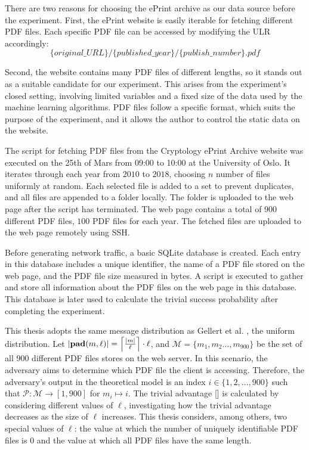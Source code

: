 There are two reasons for choosing the ePrint archive as our data source before the experiment. First, the ePrint website is easily iterable for fetching different PDF files. Each specific PDF file can be accessed by modifying the ULR accordingly:
\begin{equation*}
\{original\text{_}URL\}/\{published\text{_}year\}/\{publish\text{_}number\}.pdf
\end{equation*}

Second, the website contains many PDF files of different lengths, so it stands out as a suitable candidate for our experiment. This arises from the experiment's closed setting, involving limited variables and a fixed size of the data used by the machine learning algorithms. PDF files follow a specific format, which suits the purpose of the experiment, and it allows the author to control the static data on the website.

The script for fetching PDF files from the Cryptology ePrint Archive website was executed on the 25th of Mars from 09:00 to 10:00 at the University of Oslo. It iterates through each year from $2010$ to $2018$, choosing $n$ number of files uniformly at random. Each selected file is added to a set to prevent duplicates, and all files are appended to a folder locally. The folder is uploaded to the web page after the script has terminated. The web page contains a total of $900$ different PDF files, $100$ PDF files for each year. The fetched files are uploaded to the web page remotely using SSH.

Before generating network traffic, a basic SQLite database is created. Each entry in this database includes a unique identifier, the name of a PDF file stored on the web page, and the PDF file size measured in bytes. A script is executed to gather and store all information about the PDF files on the web page in this database. This database is later used to calculate the trivial success probability after completing the experiment.

This thesis adopts the same message distribution as Gellert et al. \cite{DBLP:conf/ctrsa/GellertJLN22}, the uniform distribution. Let $|\mathbf{pad}(m,\ell)| = \Bigl\lceil \tfrac{|m|}{\ell} \Bigr\rceil \cdot \ell$, and $\mathcal{M} = \{m_{1}, m_{2} ... , m_{900}\}$ be the set of all $900$ different PDF files stores on the web server. In this scenario, the adversary aims to determine which PDF file the client is accessing. Therefore, the adversary's output in the theoretical model is an index $i \in \{ 1, 2, ... , 900\}$ such that $\mathcal{P}: \mathcal{M} \rightarrow [1,900]$ for $m_{i} \mapsto i$. The trivial advantage [] is calculated by considering different values of $\ell$, investigating how the trivial advantage decreases as the size of $\ell$ increases. This thesis considers, among others, two special values of $\ell$: the value at which the number of uniquely identifiable PDF files is $0$ and the value at which all PDF files have the same length.

